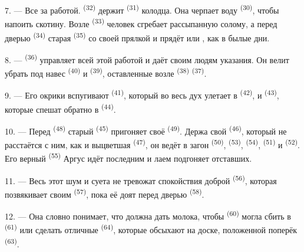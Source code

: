 7. --- Все за работой.  \textsuperscript{(32)} держит
 \textsuperscript{(31)} колодца. Она черпает воду 
\textsuperscript{(30)}, чтобы напоить скотину. Возле 
\textsuperscript{(33)} человек сгребает рассыпанную солому, а перед дверью
 \textsuperscript{(34)} старая  \textsuperscript{(35)} со
своей прялкой и  прядёт  или ,
как в былые дни.

\VUsaut{3.0mm}
\VUsaut{3.0mm}

8. ---  \textsuperscript{(36)} управляет всей этой работой и даёт
своим людям указания. Он велит убрать под навес 
\textsuperscript{(40)} и  \textsuperscript{(39)}, оставленные возле
 \textsuperscript{(38)}  \textsuperscript{(37)}.

9. --- Его окрики вспугивают  \textsuperscript{(41)}, который во
весь дух улетает в  \textsuperscript{(42)}, и 
\textsuperscript{(43)}, которые спешат обратно в 
\textsuperscript{(44)}.

10. --- Перед  \textsuperscript{(48)} старый 
\textsuperscript{(45)} пригоняет своё  \textsuperscript{(49)}. Держа
свой  \textsuperscript{(46)}, который не расстаётся с ним, как и
выцветшая  \textsuperscript{(47)}, он ведёт в загон
 \textsuperscript{(50)},  \textsuperscript{(53)},
 \textsuperscript{(54)},  \textsuperscript{(51)} и
 \textsuperscript{(52)}. Его верный  \textsuperscript{(55)}
Аргус идёт последним и лаем подгоняет отставших.

11. --- Весь этот шум и суета не тревожат спокойствия доброй
 \textsuperscript{(56)}, которая позвякивает своим
 \textsuperscript{(57)}, пока её доят перед дверью
 \textsuperscript{(58)}.

12. --- Она словно понимает, что должна дать молока, чтобы
 \textsuperscript{(60)} могла сбить  в
 \textsuperscript{(61)} или сделать отличные 
\textsuperscript{(64)}, которые обсыхают на доске, положенной поперёк
 \textsuperscript{(63)}.

